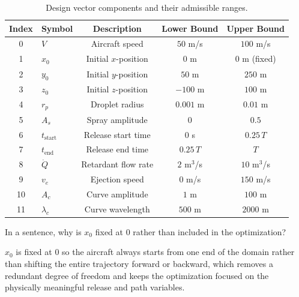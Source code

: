 \documentclass{article}
\begin{document}
\begin{enumerate}
\begin{table}[H]
\centering
\caption{Design vector components and their admissible ranges.}
\label{tab:lam}
\begin{tabular}{clccc}
\toprule
Index & Symbol & Description & Lower Bound & Upper Bound \\
\midrule
0  & $V$             & Aircraft speed              & $50$ m/s & $100$ m/s \\
1  & $x_0$           & Initial $x$-position        & $0$ m              & $0$ m (fixed)       \\
2  & $y_0$           & Initial $y$-position        & $50$ m              & $250$ m             \\
3  & $z_0$           & Initial $z$-position        & $-100$ m           & $100$ m             \\
4  & $r_p$           & Droplet radius              & $0.001$ m          & $0.01$ m            \\
5  & $A_s$           & Spray amplitude             & $0$                & $0.5$               \\
6  & $t_\text{start}$& Release start time          & $0$ s              & $0.25\,T$           \\
7  & $t_\text{end}$  & Release end time            & $0.25\,T$          & $T$                 \\
8  & $\dot{Q}$       & Retardant flow rate         & $2$ m$^3$/s        & $10$ m$^3$/s        \\
9  & $v_e$           & Ejection speed              & $0$ m/s            & $150$ m/s           \\
10 & $A_c$           & Curve amplitude             & $1$ m              & $100$ m             \\
11 & $\lambda_c$     & Curve wavelength            & $500$ m            & $2000$ m            \\
\bottomrule
\end{tabular}
\end{table}

In a sentence, why is $x_0$ fixed at $0$ rather than included in the optimization?

\begin{answer}
$x_0$ is fixed at $0$ so the aircraft always starts from one end of the domain rather than shifting the entire trajectory forward or backward, which removes a redundant degree of freedom and keeps the optimization focused on the physically meaningful release and path variables.
\end{answer}



\end{enumerate}
\end{document}
